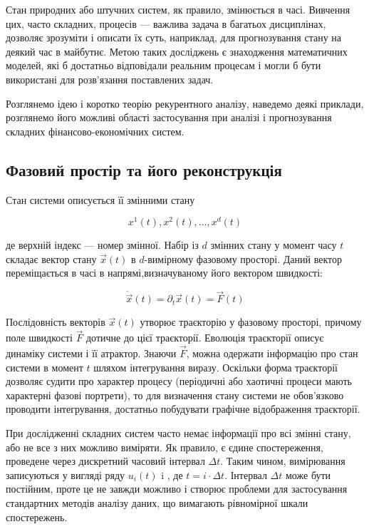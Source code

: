 \documentclass[
  letterpaper,
]{report}
\begin{document}
Стан природних або штучних систем, як правило, змінюється в часі.
Вивчення цих, часто складних, процесів --- важлива задача в багатьох
дисциплінах, дозволяє зрозуміти і описати їх суть, наприклад, для
прогнозування стану на деякий час в майбутнє. Метою таких досліджень є
знаходження математичних моделей, які б достатньо відповідали реальним
процесам і могли б бути використані для розв'язання поставлених задач.

Розглянемо ідею і коротко теорію рекурентного аналізу, наведемо деякі
приклади, розглянемо його можливі області застосування при аналізі і
прогнозування складних фінансово-економічних систем.

\hypertarget{ux444ux430ux437ux43eux432ux438ux439-ux43fux440ux43eux441ux442ux456ux440-ux442ux430-ux439ux43eux433ux43e-ux440ux435ux43aux43eux43dux441ux442ux440ux443ux43aux446ux456ux44f}{%
\subsection{Фазовий простір та його
реконструкція}\label{ux444ux430ux437ux43eux432ux438ux439-ux43fux440ux43eux441ux442ux456ux440-ux442ux430-ux439ux43eux433ux43e-ux440ux435ux43aux43eux43dux441ux442ux440ux443ux43aux446ux456ux44f}}

Стан системи описується її змінними стану

\[
x^1(t),x^2(t),...,x^d(t)
\]

де верхній індекс --- номер змінної. Набір із \(d\) змінних стану у
момент часу \(t\) складає вектор стану \(\vec x(t)\) в \(d\)-вимірному
фазовому просторі. Даний вектор переміщається в часі в
напрямі,визначуваному його вектором швидкості:

\[
\dot{\vec x}(t)=\partial_t\vec x(t)=\vec F(t)
\]

Послідовність векторів \(\vec x(t)\) утворює траєкторію у фазовому
просторі, причому поле швидкості \(\vec F\) дотичне до цієї траєкторії.
Еволюція траєкторії описує динаміку системи і її атрактор. Знаючи
\(\vec F\), можна одержати інформацію про стан системи в момент \(t\)
шляхом інтегрування виразу. Оскільки форма траєкторії дозволяє судити
про характер процесу (періодичні або хаотичні процеси мають характерні
фазові портрети), то для визначення стану системи не обов'язково
проводити інтегрування, достатньо побудувати графічне відображення
траєкторії.

При дослідженні складних систем часто немає інформації про всі змінні
стану, або не все з них можливо виміряти. Як правило, є єдине
спостереження, проведене через дискретний часовий інтервал \(\Delta t\).
Таким чином, вимірювання записуються у вигляді ряду \(u_i(t)\) i , де
\(t=i\cdot \Delta t\). Інтервал \(\Delta t\) може бути постійним, проте
це не завжди можливо і створює проблеми для застосування стандартних
методів аналізу даних, що вимагають рівномірної шкали спостережень.
\end{document}
